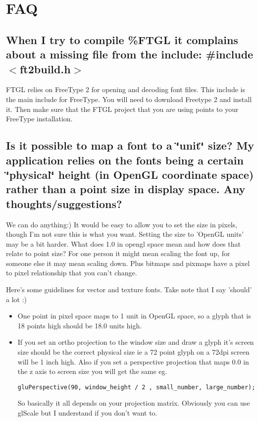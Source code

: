 \section{FAQ}\label{ftgl-faq_faq}
\subsection{When I try to compile \%FTGL it complains about a missing file from the include: \#include $<$ft2build.h$>$}\label{ftgl-faq_faq1}
FTGL relies on FreeType 2 for opening and decoding font files. This include is the main include for FreeType. You will need to download Freetype 2 and install it. Then make sure that the FTGL project that you are using points to your FreeType installation.\subsection{Is it possible to map a font to a \char`\"{}unit\char`\"{} size? My application relies on the fonts being a certain \char`\"{}physical\char`\"{} height (in OpenGL coordinate space) rather than a point size in display space. Any thoughts/suggestions?}\label{ftgl-faq_faq2}
We can do anything:) It would be easy to allow you to set the size in pixels, though I'm not sure this is what you want. Setting the size to 'OpenGL units' may be a bit harder. What does 1.0 in opengl space mean and how does that relate to point size? For one person it might mean scaling the font up, for someone else it may mean scaling down. Plus bitmaps and pixmaps have a pixel to pixel relationship that you can't change.

Here's some guidelines for vector and texture fonts. Take note that I say 'should' a lot :)

\begin{itemize}
\item One point in pixel space maps to 1 unit in OpenGL space, so a glyph that is 18 points high should be 18.0 units high.\end{itemize}


\begin{itemize}
\item If you set an ortho projection to the window size and draw a glyph it's screen size should be the correct physical size ie a 72 point glyph on a 72dpi screen will be 1 inch high. Also if you set a perspective projection that maps 0.0 in the z axis to screen size you will get the same eg. 

\begin{Code}\begin{verbatim}gluPerspective(90, window_height / 2 , small_number, large_number);
\end{verbatim}
\end{Code}

 So basically it all depends on your projection matrix. Obviously you can use glScale but I understand if you don't want to.\end{itemize}


